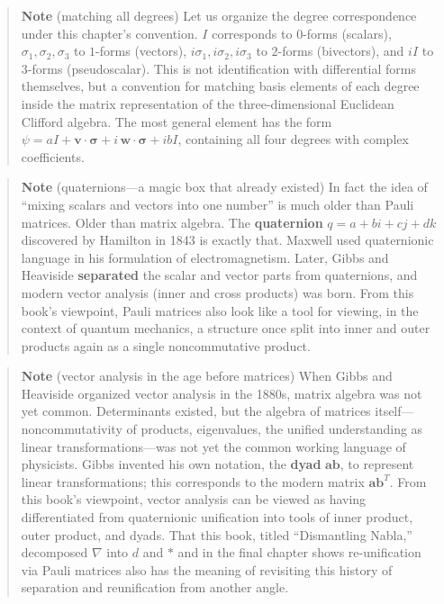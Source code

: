 \begin{quote}
\textbf{Note} (matching all degrees) Let us organize the degree
correspondence under this chapter's convention. \(I\) corresponds to
\(0\)-forms (scalars), \(\sigma_1,\sigma_2,\sigma_3\) to \(1\)-forms
(vectors), \(i\sigma_1,i\sigma_2,i\sigma_3\) to \(2\)-forms (bivectors),
and \(iI\) to \(3\)-forms (pseudoscalar). This is not identification
with differential forms themselves, but a convention for matching basis
elements of each degree inside the matrix representation of the
three-dimensional Euclidean Clifford algebra. The most general element
has the form
\(\psi = aI + \mathbf{v}\!\cdot\!\bm{\sigma} + i\,\mathbf{w}\!\cdot\!\bm{\sigma} + ibI\),
containing all four degrees with complex coefficients.
\end{quote}

\begin{quote}
\textbf{Note} (quaternions---a magic box that already existed) In fact
the idea of ``mixing scalars and vectors into one number'' is much older
than Pauli matrices. Older than matrix algebra. The \textbf{quaternion}
\(q = a + bi + cj + dk\) discovered by Hamilton in 1843 is exactly that.
Maxwell used quaternionic language in his formulation of
electromagnetism. Later, Gibbs and Heaviside \textbf{separated} the
scalar and vector parts from quaternions, and modern vector analysis
(inner and cross products) was born. From this book's viewpoint, Pauli
matrices also look like a tool for viewing, in the context of quantum
mechanics, a structure once split into inner and outer products again as
a single noncommutative product.
\end{quote}

\begin{quote}
\textbf{Note} (vector analysis in the age before matrices) When Gibbs
and Heaviside organized vector analysis in the 1880s, matrix algebra was
not yet common. Determinants existed, but the algebra of matrices
itself---noncommutativity of products, eigenvalues, the unified
understanding as linear transformations---was not yet the common working
language of physicists. Gibbs invented his own notation, the
\textbf{dyad} \(\mathbf{a}\mathbf{b}\), to represent linear
transformations; this corresponds to the modern matrix
\(\mathbf{a}\mathbf{b}^T\). From this book's viewpoint, vector analysis
can be viewed as having differentiated from quaternionic unification
into tools of inner product, outer product, and dyads. That this book,
titled ``Dismantling Nabla,'' decomposed \(\nabla\) into \(d\) and
\(\ast\) and in the final chapter shows re-unification via Pauli
matrices also has the meaning of revisiting this history of separation
and reunification from another angle.
\end{quote}

